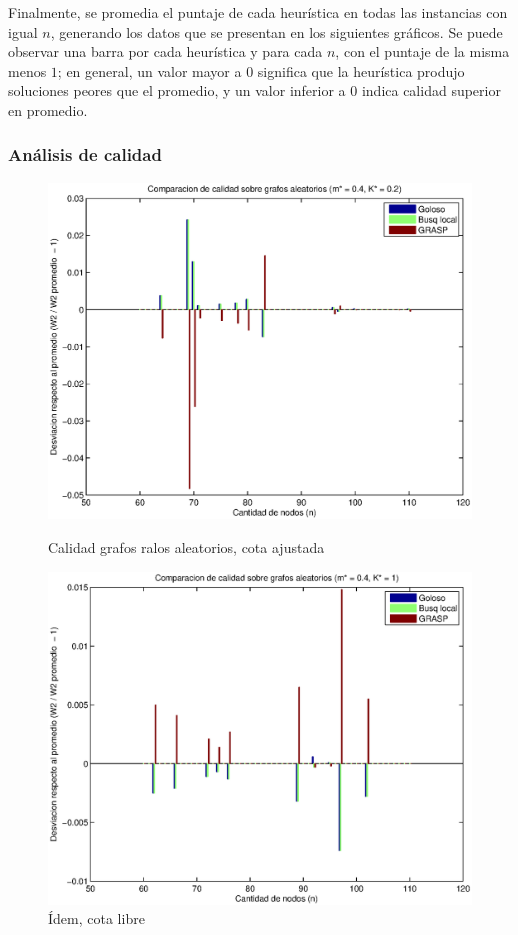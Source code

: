 Finalmente, se promedia el puntaje de cada heurística en todas las instancias con igual $n$, generando los datos que se presentan en los siguientes gráficos. Se puede observar una barra por cada heurística y para cada $n$, con el puntaje de la misma menos $1$; en general, un valor mayor a 0 significa que la heurística produjo soluciones peores que el promedio, y un valor inferior a 0 indica calidad superior en promedio.

\subsubsection{Análisis de calidad}

\begin{figure}[H]
    \begin{minipage}{0.5\linewidth}
      \includegraphics[width=\linewidth]{graficos/todos_calidad_m04_K02.eps}
      \caption{Calidad grafos ralos aleatorios, cota ajustada}\label{fig:ralos-ajustada}
    \end{minipage}
    \hfill
    \begin{minipage}{0.5\linewidth}
      \includegraphics[width=\linewidth]{graficos/todos_calidad_m04_K1.eps}
      \caption{Ídem, cota libre}\label{fig:ralos-libre}
    \end{minipage}    
\end{figure}


